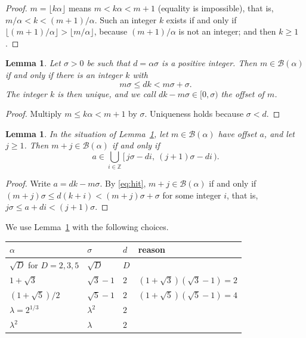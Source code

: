 \documentclass[12pt]{article}
\newcommand{\fl}[1]{\lfloor #1 \rfloor}
\newcommand{\B}{\mathcal{B}}
\newcommand{\Z}{\mathbb{Z}}
\theoremstyle{plain}
\newtheorem{lemma}[theorem]{Lemma}
\theoremstyle{remark}
\begin{document}
\begin{proof}
$m=\fl{k\alpha}$ means $m<k\alpha<m+1$ (equality is impossible), that is,
$m/\alpha<k<(m+1)/\alpha$. Such an integer $k$ exists if and only if
$\fl{(m+1)/\alpha}>\fl{m/\alpha}$, because $(m+1)/\alpha$ is not an integer; and then $k\ge1$.
\end{proof}

\begin{lemma}\label{lem:hit}
Let $\sigma>0$ be such that $d=\alpha\sigma$ is a positive integer. Then $m\in\B(\alpha)$ if
and only if there is an integer $k$ with
\begin{equation}\label{eq:hit}
m\sigma\le dk<m\sigma+\sigma .
\end{equation}
The integer $k$ is then unique, and we call $dk-m\sigma\in[0,\sigma)$ the \emph{offset} of $m$.
\end{lemma}

\begin{proof}
Multiply $m\le k\alpha<m+1$ by $\sigma$. Uniqueness holds because $\sigma<d$.
\end{proof}

\begin{lemma}\label{lem:shift}
In the situation of Lemma~\ref{lem:hit}, let $m\in\B(\alpha)$ have offset $a$, and let $j\ge1$.
Then $m+j\in\B(\alpha)$ if and only if
\[
a\in\bigcup_{i\in\Z}\bigl[\,j\sigma-di,\ (j+1)\sigma-di\,\bigr).
\]
\end{lemma}

\begin{proof}
Write $a=dk-m\sigma$. By \eqref{eq:hit}, $m+j\in\B(\alpha)$ if and only if
$(m+j)\sigma\le d(k+i)<(m+j)\sigma+\sigma$ for some integer $i$, that is,
$j\sigma\le a+di<(j+1)\sigma$.
\end{proof}

We use Lemma~\ref{lem:hit} with the following choices.
\begin{center}
\begin{tabular}{llll}
\toprule
$\alpha$ & $\sigma$ & $d$ & reason\\
\midrule
$\sqrt D$ for $D=2,3,5$ & $\sqrt D$ & $D$ & \\
$1+\sqrt3$ & $\sqrt3-1$ & $2$ & $(1+\sqrt3)(\sqrt3-1)=2$\\
$(1+\sqrt5)/2$ & $\sqrt5-1$ & $2$ & $(1+\sqrt5)(\sqrt5-1)=4$\\
$\lambda=2^{1/3}$ & $\lambda^2$ & $2$ & \\
$\lambda^2$ & $\lambda$ & $2$ & \\
\bottomrule
\end{tabular}
\end{center}
\end{document}
